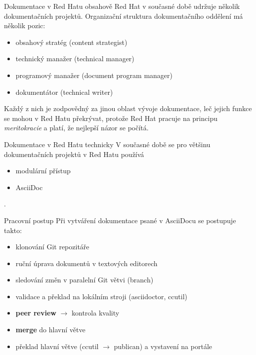 \documentclass[12pt,a4paper]{beamer}
\begin{document}
\begin{frame}{Dokumentace v Red Hatu obsahově}
Red Hat v současné době udržuje několik dokumentačních projektů. Organizační struktura dokumentačního oddělení má několik pozic:

\begin{itemize}
	\item obsahový stratég (content strategist)
	\item technický manažer (technical manager)
	\item programový manažer (document program manager)
	\item dokumentátor (technical writer)
\end{itemize}

Každý z nich je zodpovědný za jinou oblast vývoje dokumentace, leč jejich funkce se mohou v Red Hatu překrývat, protože Red Hat pracuje na principu \textit{meritokracie} a platí, že nejlepší názor se počítá. 
\end{frame}


	\begin{frame}{Dokumentace v Red Hatu technicky}
		V současné době se pro většinu dokumentačních projektů v Red Hatu používá 
		\begin{itemize}
			\item modulární přístup
			\item AsciiDoc
		\end{itemize}.
		
	\end{frame}

	\begin{frame}{Pracovní postup}
	Při vytváření dokumentace psané v AsciiDocu se postupuje takto:

	\begin{itemize}
		\item klonování Git repozitáře
		\item ruční úprava dokumentů v textových editorech
		\item sledování změn v paralelní Git větvi (branch)
		\item validace a překlad na lokálním stroji (asciidoctor, ccutil)
		\item \textbf{peer review} $\longrightarrow$ kontrola kvality
		\item \textbf{merge} do hlavní větve
		\item překlad hlavní větve (ccutil $\longrightarrow$ publican) a vystavení na portále
	\end{itemize}
	\end{frame}
\end{document}
